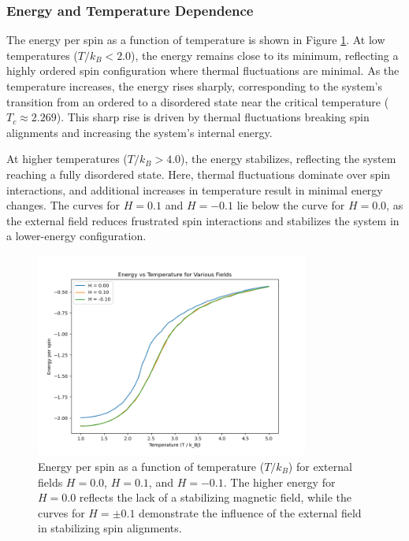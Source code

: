 \documentclass[11pt]{article}
\begin{document}
\subsubsection*{Energy and Temperature Dependence}
The energy per spin as a function of temperature is shown in Figure \ref{fig:energy_vs_temp}. At low temperatures (\(T / k_B < 2.0\)), the energy remains close to its minimum, reflecting a highly ordered spin configuration where thermal fluctuations are minimal. As the temperature increases, the energy rises sharply, corresponding to the system's transition from an ordered to a disordered state near the critical temperature (\(T_c \approx 2.269\)). This sharp rise is driven by thermal fluctuations breaking spin alignments and increasing the system's internal energy.

At higher temperatures (\(T / k_B > 4.0\)), the energy stabilizes, reflecting the system reaching a fully disordered state. Here, thermal fluctuations dominate over spin interactions, and additional increases in temperature result in minimal energy changes. The curves for \(H = 0.1\) and \(H = -0.1\) lie below the curve for \(H = 0.0\), as the external field reduces frustrated spin interactions and stabilizes the system in a lower-energy configuration.

\begin{figure}[h!]
\centering
\includegraphics[width=0.8\textwidth]{Figs_Salar/heating_E-T.png}
\caption{Energy per spin as a function of temperature (\(T / k_B\)) for external fields \(H = 0.0\), \(H = 0.1\), and \(H = -0.1\). The higher energy for \(H = 0.0\) reflects the lack of a stabilizing magnetic field, while the curves for \(H = \pm 0.1\) demonstrate the influence of the external field in stabilizing spin alignments.}
\label{fig:energy_vs_temp}
\end{figure}
\end{document}
